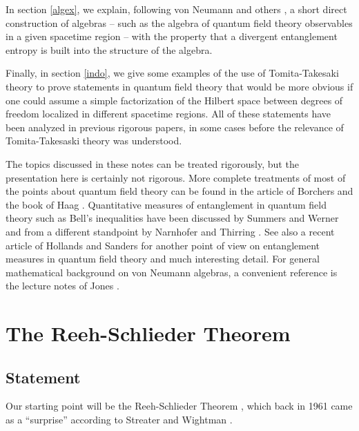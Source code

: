 \documentclass[12pt]{article}
\numberwithin{equation}{section}
\begin{document}
In section \ref{algex}, we explain, following von Neumann and others \cite{vonN,Powers,ArakiWoods}, a short direct construction of algebras -- such as the algebra of quantum field theory observables
in a given spacetime region -- with the property that a divergent entanglement entropy is built into the structure of the algebra.

Finally, in section \ref{indo}, we give some examples of the use of Tomita-Takesaki theory to prove statements in quantum field
theory that would be more obvious if one could assume a simple factorization of the Hilbert space between degrees of freedom
localized in different spacetime regions.   All of these statements have been analyzed in previous rigorous papers, in some cases
before the relevance of Tomita-Takesaski theory was understood.



The topics discussed in these notes can be treated rigorously, but the presentation here is certainly not rigorous.   More complete
treatments of most of the points about quantum field theory can be found in the article of Borchers 
\cite{Borchers} and the book of Haag \cite{Haag}. 
 Quantitative measures of entanglement in quantum field theory such as Bell's inequalities have been discussed by
Summers and Werner \cite{SW} and from a different standpoint by Narnhofer and Thirring \cite{NaT}.
See also  a recent
article of Hollands and Sanders \cite{HSa} for another point of view on entanglement measures in quantum field theory and much interesting detail.  
For general mathematical background on von Neumann algebras, a convenient reference is
the lecture notes of Jones \cite{Jones}.   

\section{The Reeh-Schlieder Theorem}\label{rst}

\subsection{Statement}

Our starting point will be the Reeh-Schlieder Theorem \cite{RS}, which back in 1961 came as a ``surprise'' 
according to Streater and Wightman 
\cite{StW}.
\end{document}
